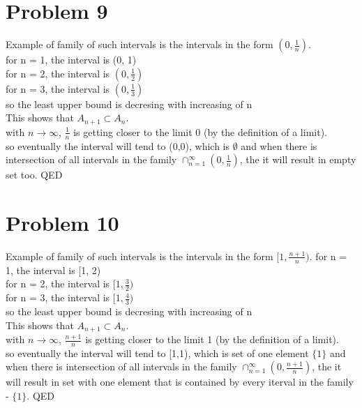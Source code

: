\documentclass{article}
\begin{document}
\section*{Problem 9}
Example of family of such intervals is the intervals in the form $(0, \frac{1}{n})$.\\
for n = 1, the interval is (0, 1)\\
for n = 2, the interval is $(0, \frac{1}{2})$\\
for n = 3, the interval is $(0, \frac{1}{3})$\\
so the least upper bound is decresing with increasing of n\\
This shows that $A_{n+1} \subset A_{n}$.\\
with $n \rightarrow \infty$, $\frac{1}{n}$ is getting closer to the limit 0 (by the definition of a limit).\\
so eventually the interval will tend to (0,0), which is $\emptyset$ and when there is intersection of all intervals in the family $\cap_{n=1}^\infty(0, \frac{1}{n})$, the it will result in empty set too. QED\\

\section*{Problem 10}
Example of family of such intervals is the intervals in the form $[1, \frac{n+1}{n})$.
for n = 1, the interval is [1, 2)\\
for n = 2, the interval is $[1, \frac{3}{2})$\\
for n = 3, the interval is $[1, \frac{4}{3})$\\
so the least upper bound is decresing with increasing of n\\
This shows that $A_{n+1} \subset A_{n}$.\\
with $n \rightarrow \infty$, $\frac{n+1}{n}$ is getting closer to the limit 1 (by the definition of a limit).\\
so eventually the interval will tend to [1,1), which is set of one element $\{1\}$ and when there is intersection of all intervals in the family $\cap_{n=1}^\infty(0, \frac{n+1}{n})$, the it will result in set with one element that is contained by every iterval in the family - $\{1\}$. QED\\
\end{document}
